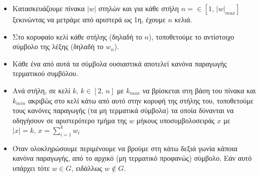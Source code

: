 \begin{tcolorbox}[colback=yellow!15!white, colframe=blue!50!white,
	fonttitle=\bfseries\Large, title = {Πίνακας συντακτικής ανάλυσης για $w = babba$}]

\begin{itemize}
	\itemsep0em
	\item Κατασκευάζουμε πίνακα $|w|$ στηλών και για κάθε στήλη $n = \in [1,\, |w|_{max}]$ ξεκινώντας να μετράμε
	από αριστερά ως 1η, έχουμε $n$ κελιά.

	\item Στο κορυφαίο κελί κάθε στήλης (δηλαδή το $n$), τοποθετούμε το αντίστοιχο σύμβολο της λέξης (δηλαδή το
	$w_n$).
	\item Κάθε ένα από αυτά τα σύμβολα ουσιαστικά αποτελεί κανόνα παραγωγής τερματικού συμβόλου.

	\item Ανά στήλη, σε κελί $k,\, k \in [2,\, n]$ με $k_{max}$ να βρίσκεται στη βάση του πίνακα και
	$k_{min}$ ακριβώς στο κελί κάτω από αυτό στην κορυφή της στήλης του, τοποθετούμε τους κανόνες παραγωγής (τα μη
	τερματικά σύμβολα) τα οποία δύνανται να οδηγήσουν σε αριστερότερο τμήμα της $w$ μήκους υποσυμβολοσειράς $x$ με
	$|x| = k,\, x= \displaystyle \sum_{i=1}^{k} w_i $

	\item Όταν ολοκληρώσουμε περιμένουμε να βρούμε στη κάτω δεξιά γωνία κάποια κανόνα παραγωγής, από το αρχικό (μη
	τερματικό προφανώς) σύμβολο. Εάν αυτό υπάρχει τότε $w \in G$, ειδάλλως $w \notin G$.

\end{itemize}

	\reducevspace\reducevspace\reducevspace\reducevspace\reducevspace\reducevspace
	\reducevspace\reducevspace\reducevspace\reducevspace\reducevspace\reducevspace
	\reducevspace\reducevspace\reducevspace\reducevspace\reducevspace\reducevspace
	\reducevspace\reducevspace\reducevspace\reducevspace\reducevspace\reducevspace
	\reducevspace\reducevspace\reducevspace\reducevspace\reducevspace\reducevspace
	\reducevspace\reducevspace\reducevspace\reducevspace\reducevspace\reducevspace
\begin{center}
\end{center}
\end{tcolorbox}
